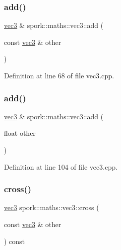 \subsubsection{\texorpdfstring{add()}{add()}\hspace{0.1cm}{\footnotesize\ttfamily [1/2]}}
{\footnotesize\ttfamily \hyperlink{structspork_1_1maths_1_1vec3}{vec3} \& spork\+::maths\+::vec3\+::add (\begin{DoxyParamCaption}\item[{const \hyperlink{structspork_1_1maths_1_1vec3}{vec3} \&}]{other }\end{DoxyParamCaption})}



Definition at line 68 of file vec3.\+cpp.

\mbox{\label{structspork_1_1maths_1_1vec3_aba6c94c85a9a1bd500c5c2e78da49a3a}} 
\subsubsection{\texorpdfstring{add()}{add()}\hspace{0.1cm}{\footnotesize\ttfamily [2/2]}}
{\footnotesize\ttfamily \hyperlink{structspork_1_1maths_1_1vec3}{vec3} \& spork\+::maths\+::vec3\+::add (\begin{DoxyParamCaption}\item[{float}]{other }\end{DoxyParamCaption})}



Definition at line 104 of file vec3.\+cpp.

\mbox{\label{structspork_1_1maths_1_1vec3_a94bddcfa1c5db496698f37564df5856d}} 
\subsubsection{\texorpdfstring{cross()}{cross()}}
{\footnotesize\ttfamily \hyperlink{structspork_1_1maths_1_1vec3}{vec3} spork\+::maths\+::vec3\+::cross (\begin{DoxyParamCaption}\item[{const \hyperlink{structspork_1_1maths_1_1vec3}{vec3} \&}]{other }\end{DoxyParamCaption}) const}



